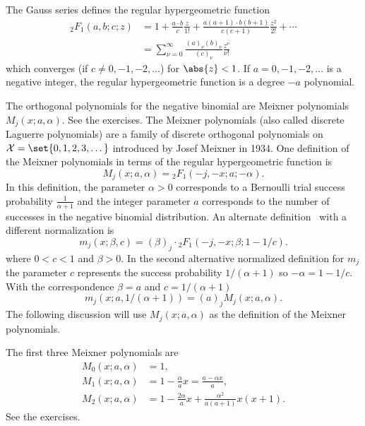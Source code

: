 \documentclass[12pt]{article}
\begin{document}

The Gauss series defines the regular hypergeometric function%
\begin{align*}
    {}_2F_1(a,b; c; z) &= 1 + \frac{a \cdot b}{c} \frac{z}{1!} + \frac{a
    (a+1) \cdot b(b+1)}{c(c+1)} \frac{z^2}{2!} + \cdots \\
    & =\sum\limits_{\nu=0}^{\infty} \frac{(a)_{\nu} (b)_{\nu}}{(c)_{\nu}}
    \frac{z^{\nu}}{\nu!}
\end{align*}
which converges (if \( c \ne 0, -1,-2, \dots \)) for \( \abs{z} < 1 \).
If \( a = 0, -1, -2, \dots \) is a negative integer, the regular
hypergeometric function is a degree \( -a \) polynomial.

The orthogonal polynomials for the negative binomial are Meixner
polynomials \( M_j(x; a, \alpha) \).%
See the exercises.  The Meixner polynomials (also called discrete
Laguerre polynomials) are a family of discrete orthogonal polynomials on
\( \mathcal{X} = \set{0,1,2,3, \dots} \) introduced by Josef Meixner in
1934.  One definition of the Meixner polynomials in terms of the regular
hypergeometric function is
\[
    M_j(x; a, \alpha) = {}_2F_1 \left( -j, -x; a; -\alpha \right).
\] In this definition, the parameter \( \alpha > 0 \) corresponds to a
Bernoulli trial success probability \( \frac{1}{\alpha + 1} \) and the
integer parameter \( a \) corresponds to the number of successes in the
negative binomial distribution.  An alternate definition~%
\cite[V-3.4, page 161]{chihara78} with a different normalization is
\[
    m_j(x; \beta, c) = (\beta)_j \cdot {}_2F_1 \left( -j, -x; \beta; 1 -
    1/c \right).
\] where \( 0 < c < 1 \) and \( \beta > 0 \).  In the second alternative
normalized definition for \( m_j \) the parameter \( c \) represents the
success probability \( 1/(\alpha+1) \) so \( -\alpha = 1 - 1/c \).  With
the correspondence \( \beta = a \) and \( c = 1/(\alpha + 1) \)
\[
    m_j(x; a, 1/(\alpha+1) ) = (a)_j M_j(x; a, \alpha).
\] The following discussion will use \( M_j(x; a, \alpha) \) as the
definition of the Meixner polynomials.

The first three Meixner polynomials are
\begin{align*}
    M_0(x; a,\alpha) &= 1, \\
    M_1(x; a,\alpha) &= 1 - \frac{\alpha}{a}x = \frac{a - \alpha x}{a},\\
    M_2(x; a,\alpha) &= 1 - \frac{2\alpha}{a}x + \frac{\alpha^2}{a(a+1)}x
    (x+1).
\end{align*}
See the exercises.
\end{document}
